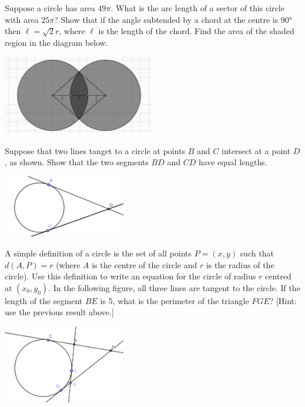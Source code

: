 \begin{questions}
  \question Suppose a circle has area $ 49\pi $. What is the arc length of a sector of this circle with area $ 25\pi $?
  \question Show that if the angle subtended by a chord at the centre is \ang{90} then $ \ell = \sqrt{2}r $, where $ \ell $
            is the length of the chord.
  \question Find the area of the shaded region in the diagram below.
            \begin{center}
              \includegraphics[width=0.5\textwidth]{overlapcircle}
            \end{center}
  \question Suppose that two lines tanget to a circle at points $ B $ and $ C $ intersect at a point $ D $, as shown. Show that
            the two segments $ BD $ and $ CD $ have equal lengths.
            \begin{center}
              \includegraphics[width=0.4\textwidth]{cirtangents}
            \end{center}
  \question A simple definition of a circle is the set of all points $ P = (x,y) $ such that $ d(A, P) = r $ (where $ A $ is the centre of the circle
            and $ r $ is the radius of the circle). Use this definition to write an equation for the circle of radius $ r $ centred at $ (x_0,y_0) $.
  \clearpage
  \question In the following figure, all three lines are tangent to the circle. If the length of the segment $BE$ is 5, what is the perimeter of the triangle $FGE$?
            [Hint: use the previous result above.]
            \begin{center}
              \includegraphics[width=0.4\textwidth]{cirtangents3}
            \end{center}
  \question
    \begin{parts}

\end{parts}
\end{questions}
